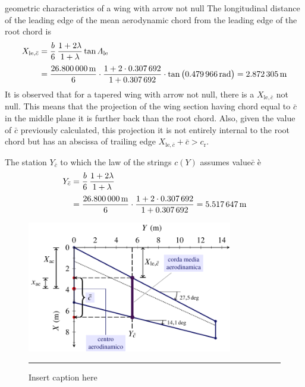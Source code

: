 \documentclass[[12pt,twoside]{book}
\begin{document}
\begin{myExampleX}{geometric characteristics of a wing with arrow not null}{}
The longitudinal distance of the leading edge of the mean aerodynamic chord from the
leading edge of the root chord is
\[
\begin{split}
X_{\mathrm{le},\bar{c}} 
  & {}=
    \frac{b}{6} \, \frac{1+2\lambda}{1+\lambda} \tan\Lambda_\mathrm{le} \\[3pt]
  & {}=
    \frac{\SI[round-precision=1]{\mySpanWingMT}{\metre}}{6}
      \cdot 
      \frac{
        1 + 2\cdot\SI[round-precision=2]{\myTaperRatioWing}{}
      }{
        1 + \SI[round-precision=2]{\myTaperRatioWing}{}
      }
      \cdot \tan \big( \SI[round-precision=3]{\myLambdaLERad}{\radian} \big)
    = \SI[round-precision=2]{\myXLEMACWingMT}{\metre} 
\end{split}
\]
It is observed that for a tapered wing with arrow not null, there is a
$X_{\mathrm{le},\bar{c}}$ not null. This means that the projection of the wing section having
chord equal to $\bar{c}$ in the middle plane it is further back than the root chord.
Also, given the value of $\bar{c}$ previously calculated, this projection
it is not entirely internal to the root chord but has an abscissa of trailing edge
$X_{\mathrm{le},\bar{c}}+\bar{c}>c_\mathrm{r}$.

The station $Y_{\bar{c}}$ to which the law of the strings $c(Y)$ assumes value$\bar{c}$ è
\[
\begin{split}
Y_{\bar{c}} 
  & {}=
    \frac{b}{6} \, \frac{1+2\lambda}{1+\lambda} \\[3pt]
  & {}=
    \frac{\SI[round-precision=1]{\mySpanWingMT}{\metre}}{6}
      \cdot 
      \frac{
        1 + 2\cdot\SI[round-precision=2]{\myTaperRatioWing}{}
      }{
        1 + \SI[round-precision=2]{\myTaperRatioWing}{}
      }
    =  \SI[round-precision=2]{\myYMACWingMT}{\metre} 
\end{split}
\]

\begin{figure}[t]
    \centering
    \includegraphics[width=0.8\textwidth]{Chapter_2/temp/wing_ac_1_drawing.pdf}
    \rule{2cm}{0pt}
    \caption{Insert caption here}
    \label{fig:my:label}
\end{figure}


\end{myExampleX}
\end{document}
